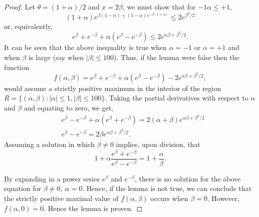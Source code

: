 \documentclass[a4paper,10pt]{article}
\theoremstyle{plain}
\theoremstyle{definition}
\theoremstyle{remark}
\begin{document}
\begin{proof}
Let $\theta= (1+\alpha)/2$ and $x=2\beta$, we must show that for $-1 \alpha \leq +1$, 
\begin{equation*}
(1+\alpha)e^{\beta(1-\alpha)+(1-\alpha)e^{-\beta{(1+\alpha)}}} \leq 2e^{\beta^2 /2}
\end{equation*}
or, equivalently,
\begin{equation*}
e^\beta+e^{-\beta}+\alpha(e^\beta-e^{-\beta}) \leq 2e^{\alpha\beta+\beta^2/2}.
\end{equation*}
It can be seen that the above inequality is true when $\alpha=-1$ or $\alpha=+1$ and when $\beta$ is large (say when $|\beta| \leq 100$). Thus, if the lemma were false then the function
\begin{equation*}
f(\alpha, \beta) = e^{\beta}+e^{-\beta}+\alpha(e^\beta-e^{-\beta})-2e^{\alpha\beta+\beta^2/2},
\end{equation*}
would assume a strictly positive maximum in the interior of the region $R=\{(\alpha,\beta): |\alpha|\leq 1, |\beta| \leq 100\}$. Taking the partial derivatives with respect to $\alpha$ and $\beta$ and equating to zero, we get,
\begin{eqnarray*}
&e^{\beta}-e^{-\beta}+\alpha(e^{\beta}+e^{-\beta})=2(\alpha+\beta)e^{\alpha\beta+\beta^2/2} \\
&e^{\beta}-e^{-\beta} = 2\beta e^{\alpha\beta+\beta^2/2}. 
\end{eqnarray*}
Assuming a solution in which $\beta \neq 0$ implies, upon division, that
\begin{equation*}
1+ \alpha \frac{e^{\beta}+e^{-\beta}}{e^{\beta}-e^{-\beta}}=1+\frac{\alpha}{\beta}.
\end{equation*}

By expanding in a power series $e^\beta$ and $e^{-\beta}$, there is no solution for the above equation for $\beta \neq 0,~ \alpha =0$. Hence, if the lemma is not true, we can conclude that the strictly positive maximal value of $f(\alpha,\beta)$  occurs when $\beta =0$. However, $f(\alpha, 0)=0$. Hence the lemma is proven.
\end{proof}
\end{document}
